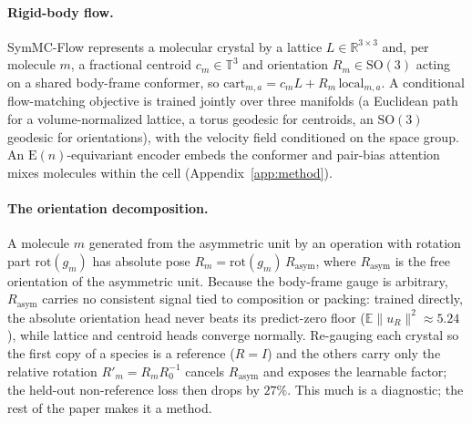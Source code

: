 \documentclass{article}
\begin{document}
\paragraph{Rigid-body flow.}
SymMC-Flow represents a molecular crystal by a lattice
$L\in\mathbb{R}^{3\times3}$ and, per molecule $m$, a fractional centroid
$c_m\in\mathbb{T}^3$ and orientation $R_m\in\mathrm{SO}(3)$ acting on a shared
body-frame conformer, so
$\text{cart}_{m,a}=c_mL+R_m\,\text{local}_{m,a}$. A conditional flow-matching
objective\cite{lipman2023flowmatching} is trained jointly over three manifolds
(a Euclidean path for a volume-normalized lattice, a torus geodesic for
centroids, an $\mathrm{SO}(3)$ geodesic for orientations), with the velocity
field conditioned on the space group. An $\mathrm{E}(n)$-equivariant
encoder\cite{satorras2021egnn} embeds the conformer and pair-bias attention mixes
molecules within the cell (Appendix~\ref{app:method}).

\paragraph{The orientation decomposition.}
A molecule $m$ generated from the asymmetric unit by an operation with rotation
part $\mathrm{rot}(g_m)$ has absolute pose
$R_m=\mathrm{rot}(g_m)\,R_{\text{asym}}$, where $R_{\text{asym}}$ is the free
orientation of the asymmetric unit. Because the body-frame gauge is arbitrary,
$R_{\text{asym}}$ carries no consistent signal tied to composition or packing:
trained directly, the absolute orientation head never beats its predict-zero
floor ($\mathbb{E}\lVert u_R\rVert^2\!\approx\!5.24$), while lattice and centroid
heads converge normally. Re-gauging each crystal so the first copy of a species
is a reference ($R{=}I$) and the others carry only the relative rotation
$R'_m=R_mR_0^{-1}$ cancels $R_{\text{asym}}$ and exposes the learnable factor;
the held-out non-reference loss then drops by $27\%$. This much is a diagnostic;
the rest of the paper makes it a method.
\end{document}
